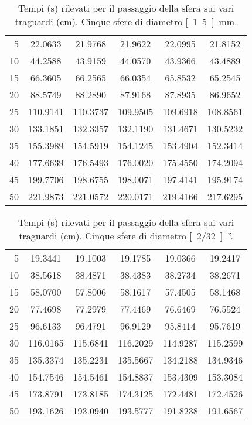 \begin{table}[hp]\caption{Tempi (\unit{s}) rilevati per il passaggio della sfera sui vari traguardi (\unit{cm}). Cinque sfere di diametro \unit[1.5]{mm}.}
\centering \small
\begin{tabular}{r*5c}
5 &22.0633 &21.9768 &21.9622 &22.0995 &21.8152\\
10 &44.2588 &43.9159 &44.0570 &43.9366 &43.4889\\
15 &66.3605 &66.2565 &66.0354 &65.8532 &65.2545\\
20 &88.5749 &88.2890 &87.9168 &87.8935 &86.9652\\
25 &110.9141 &110.3737 &109.9505 &109.6918 &108.8561\\
30 &133.1851 &132.3357 &132.1190 &131.4671 &130.5232\\
35 &155.3989 &154.5919 &154.1245 &153.4904 &152.3414\\
40 &177.6639 &176.5493 &176.0020 &175.4550 &174.2094\\
45 &199.7706 &198.6755 &198.0071 &197.4141 &195.9174\\
50 &221.9873 &221.0572 &220.0171 &219.4166 &217.6295
\end{tabular}
\end{table}
\begin{table}[hp]\caption{Tempi (\unit{s}) rilevati per il passaggio della sfera sui vari traguardi (\unit{cm}). Cinque sfere di diametro \unit[2/32]{''}.}
\centering \small
\begin{tabular}{r*5c}
5 &19.3441 &19.1003 &19.1785 &19.0366 &19.2417\\
10 &38.5618 &38.4871 &38.4383 &38.2734 &38.2671\\
15 &58.0700 &57.8006 &58.1617 &57.4505 &58.1468\\
20 &77.4698 &77.2979 &77.4469 &76.6469 &76.5524\\
25 &96.6133 &96.4791 &96.9129 &95.8414 &95.7619\\
30 &116.0165 &115.6841 &116.2029 &114.9287 &115.2599\\
35 &135.3374 &135.2231 &135.5667 &134.2188 &134.9346\\
40 &154.7546 &154.5461 &154.8837 &153.4309 &153.3084\\
45 &173.8791 &173.8185 &174.3125 &172.4481 &172.4526\\
50 &193.1626 &193.0940 &193.5777 &191.8238 &191.6567
\end{tabular}
\end{table}
